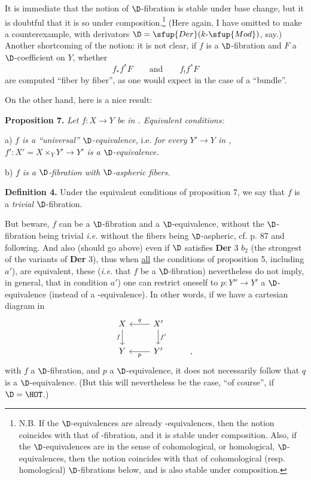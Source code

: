 It is immediate that the notion of $\D$-fibration is stable under base change, but it is doubtful that it is so under composition.\footnote[60]{N.B. If the $\D$-equivalences are already \Hot-equivalences, then the notion coincides with that of \Hot-fibration, and it is stable under composition. Also, if the $\D$-equivalences are in the sense of cohomological, or homological, $\D$-equivalences, then the notion coincides with that of cohomological (resp. homological) $\D$-fibrations below, and is also stable under composition.} (Here again, I have omitted to make a counterexample, with derivators $\D = \sfup{Der}(k\text{-}\sfup{Mod})$, say.) Another shortcoming of the notion: it is not clear, if $f$ is a $\D$-fibration and $F$ a $\D$-coefficient on $Y$, whether
\[
f_*f^*F \qquad \text{and} \qquad f_!f^*F
\]
are computed ``fiber by fiber'', as one would expect in the case of a ``bundle''.

On the other hand, here is a nice result:

\textbf{Proposition 7.} \textit{Let $f : X \to Y$ be in \Dia. Equivalent conditions:}

a) \textit{$f$ is a ``universal'' $\D$-equivalence,} i.e. \textit{for every $Y' \to Y$ in \Dia, $f' : X' = X \times_Y Y' \to Y'$ is a $\D$-equivalence.}

b) \textit{$f$ is a $\D$-fibration with $\D$-aspheric fibers.}

\textbf{Definition 4.} Under the equivalent conditions of proposition 7, we say that $f$ is a \textit{trivial} $\D$-fibration.

But beware, $f$ can be a $\D$-fibration and a $\D$-equivalence, without the $\D$-fibration being trivial \textit{i.e.} without the fibers being $\D$-aspheric, cf. p. 87 and following. %
And also (should go above) even if $\D$ satisfies \textbf{Der} 3 $b_2$ (the strongest of the variants of \textbf{Der} 3), thus when \underline{all} the conditions of proposition 5, including $a'$), are equivalent, these (\textit{i.e.} that $f$ be a $\D$-fibration) nevertheless do not imply, in general, that in condition $a'$) one can restrict oneself to $p : Y'' \to Y'$ a $\D$-equivalence (instead of a \Hot-equivalence). In other words, if we have a cartesian diagram in \Dia
\[
\begin{tikzcd}
X \arrow[d, "f"'] & X' \arrow[l, "q"'] \arrow[d, "f'"] \\
Y & Y' \arrow[l, "p"] & ,
\end{tikzcd}
\]
with $f$ a $\D$-fibration, and $p$ a $\D$-equivalence, it does not necessarily follow that $q$ is a $\D$-equivalence. (But this will nevertheless be the case, ``of course'', if $\D = \HOT$.)

